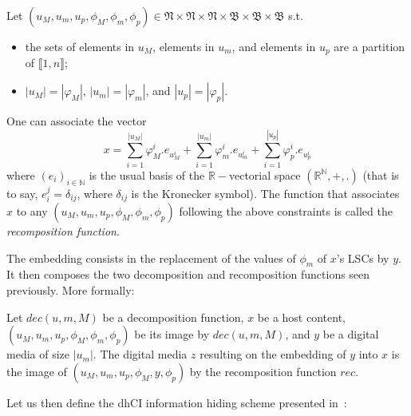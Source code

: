 \documentclass{comjnl}
\begin{document}
\begin{definition}[Recomposition]
Let 
$(u_M,u_m,u_p,\phi_{M},\phi_{m},\phi_{p}) \in 
\mathfrak{N} \times 
\mathfrak{N} \times 
\mathfrak{N} \times 
\mathfrak{B} \times 
\mathfrak{B} \times 
\mathfrak{B} 
$ s.t.
\begin{itemize}
\item the sets of elements in $u_M$, elements in $u_m$, and 
elements in $u_p$ are a partition of $\llbracket 1, n\rrbracket$;
\item $|u_M| = |\varphi_M|$, $|u_m| = |\varphi_m|$, and $|u_p| = |\varphi_p|$.  
\end{itemize}
One can associate the vector 
\[
x = 
\sum_{i=1}^{|u_M|} \varphi^i_M . e_{{u^i_M}} +  
\sum_{i=1}^{|u_m|} \varphi^i_m .e_{{u^i_m}} +  
\sum_{i=1}^{|u_p|} \varphi^i_p. e_{{u^i_p}} 
\]
\noindent where 
$(e_i)_{i \in \mathds{N}}$ is the usual basis of the $\mathds{R}-$vectorial space $\left(\mathds{R}^\mathds{N}, +, .\right)$ (that is to say, $e_i^j = \delta_{ij}$, where $\delta_{ij}$ is the Kronecker symbol).
The function that associates $x$ to any 
$(u_M,u_m,u_p,\phi_{M},\phi_{m},\phi_{p})$ following the above constraints 
is called the \emph{recomposition function}.
\end{definition}

The embedding consists in the replacement of the values of 
$\phi_{m}$ of $x$'s LSCs  by $y$. 
It then composes the two decomposition and
recomposition functions seen previously. More formally:


\begin{definition}
Let $\textit{dec}(u,m,M)$ be a decomposition function,
$x$ be a host content,
$(u_M,u_m,u_p,\phi_{M},\phi_{m},\phi_{p})$ be its image by $\textit{dec}(u,m,M)$, 
and $y$ be a digital media of size $|u_m|$.
The digital media $z$ resulting on the embedding of $y$ into $x$ is 
the image of $(u_M,u_m,u_p,\phi_{M},y,\phi_{p})$
by  the recomposition function $\textit{rec}$.
\end{definition}

Let us then define the dhCI information hiding scheme
presented in~\cite{gfb10:ip}:
\end{document}
